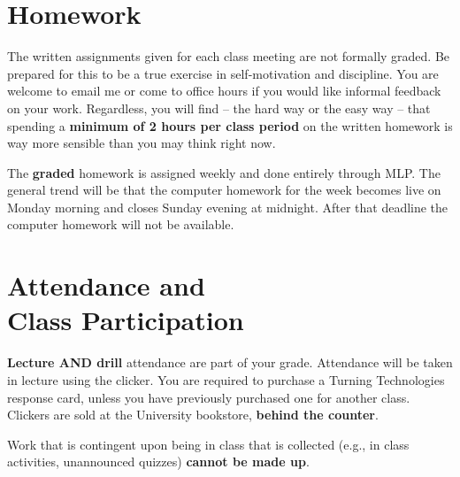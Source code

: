 \documentclass[margin,line,pifont,palatino,courier]{res}
\begin{document}
\begin{resume}
\section{\sc Homework} The written assignments given for each class meeting are not formally graded.  Be prepared for this to be a true exercise in self-motivation and discipline.  You are welcome to email me or come to office hours if you would like informal feedback on your work.  Regardless, you will find -- the hard way or the easy way -- that spending a {\bf minimum of 2 hours per class period} on the written homework is way more sensible than you may think right now.     

The {\bf graded} homework is assigned weekly and done entirely through MLP.  The general trend will be that the computer homework for the week becomes live on Monday morning and closes Sunday evening at midnight. After that deadline the computer homework will not be available.  

\section{\sc Attendance and \\ Class Participation} {\bf Lecture AND drill} attendance are part of your grade.  Attendance will be taken in lecture using the clicker.  You are required to purchase a Turning Technologies response card, unless you have previously purchased one for another class.  Clickers are sold at the University bookstore, {\bf behind the counter}.

Work that is contingent upon being in class that is collected (e.g., in class activities, unannounced quizzes) {\bf cannot be made up}.  



\end{resume}
\end{document}
